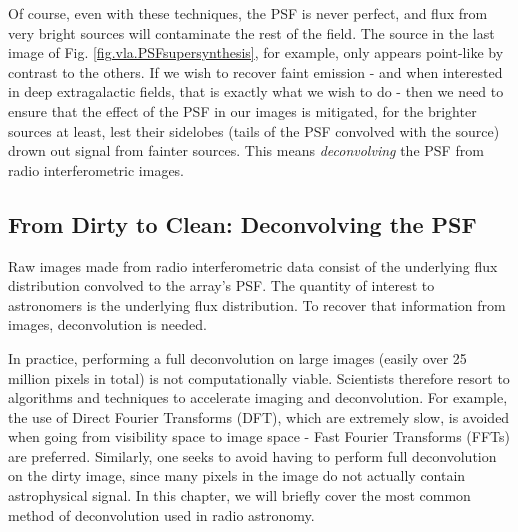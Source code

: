 \pg
Of course, even with these techniques, the PSF is never perfect, and flux from very bright sources will contaminate the rest of the field. The source in the last image of Fig. \ref{fig.vla.PSFsupersynthesis}, for example, only appears point-like by contrast to the others. If we wish to recover faint emission - and when interested in deep extragalactic fields, that is exactly what we wish to do - then we need to ensure that the effect of the PSF in our images is mitigated, for the brighter sources at least, lest their sidelobes (tails of the PSF convolved with the source) drown out signal from fainter sources. This means \emph{deconvolving} the PSF from radio interferometric images.

\subsection{From Dirty to Clean: Deconvolving the PSF}\label{section.clean}

\pg
Raw images made from radio interferometric data consist of the underlying flux distribution convolved to the array's PSF. The quantity of interest to astronomers is the underlying flux distribution. To recover that information from images, deconvolution is needed.

\pg
In practice, performing a full deconvolution on large images (easily over 25 million pixels in total) is not computationally viable. Scientists therefore resort to algorithms and techniques to accelerate imaging and deconvolution. For example, the use of Direct Fourier Transforms (DFT), which are extremely slow, is avoided when going from visibility space to image space - Fast Fourier Transforms (FFTs) are preferred. Similarly, one seeks to avoid having to perform full deconvolution on the dirty image, since many pixels in the image do not actually contain astrophysical signal. In this chapter, we will briefly cover the most common method of deconvolution used in radio astronomy.

